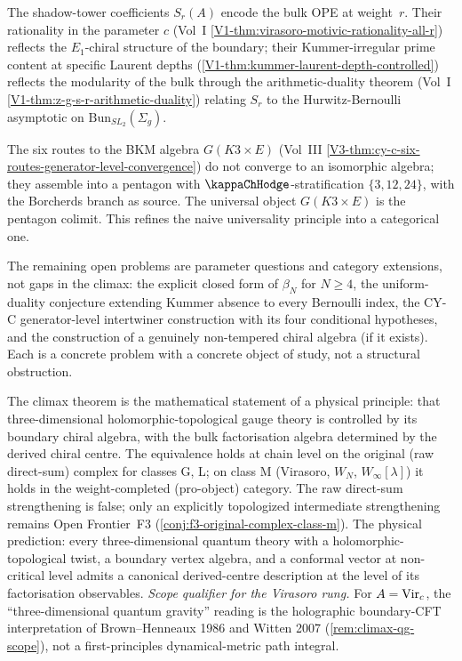 The shadow-tower coefficients $S_{r}(A)$ encode the bulk OPE at
weight~$r$. Their rationality in the parameter $c$ (Vol~I
\cref{V1-thm:virasoro-motivic-rationality-all-r}) reflects the
$E_{1}$-chiral structure of the boundary; their Kummer-irregular
prime content at specific Laurent depths
(\cref{V1-thm:kummer-laurent-depth-controlled}) reflects the
modularity of the bulk through the arithmetic-duality theorem
(Vol~I \cref{V1-thm:z-g-s-r-arithmetic-duality}) relating $S_{r}$ to
the Hurwitz-Bernoulli asymptotic on $\mathrm{Bun}_{SL_{2}}(\Sigma_{g})$.

The six routes to the BKM algebra $G(K3 \times E)$
(Vol~III \cref{V3-thm:cy-c-six-routes-generator-level-convergence})
do not converge to an isomorphic algebra; they assemble into a
pentagon with $\kappaChHodge$-stratification
$\{3, 12, 24\}$, with the Borcherds branch as source. The
universal object $G(K3 \times E)$ is the pentagon colimit. This
refines the naive universality principle into a categorical
one.

\begin{remark}
The remaining open problems are parameter
questions and category extensions, not gaps in the climax: the
explicit closed form of $\beta_{N}$ for $N \ge 4$, the
uniform-duality conjecture extending Kummer absence to every
Bernoulli index, the CY-C generator-level intertwiner
construction with its four conditional hypotheses, and the
construction of a genuinely non-tempered chiral algebra (if it
exists). Each is a concrete problem with a concrete object of
study, not a structural obstruction.
\end{remark}

\begin{remark}
The climax theorem is the mathematical statement of a physical
principle: that three-dimensional holomorphic-topological gauge
theory is controlled by its boundary chiral algebra, with the
bulk factorisation algebra determined by the derived chiral
centre. The equivalence holds at chain level on the original
(raw direct-sum) complex for classes G, L; on class M (Virasoro,
$W_{N}$, $W_{\infty}[\lambda]$) it holds in the weight-completed
(pro-object) category. The raw direct-sum strengthening is false;
only an explicitly topologized intermediate strengthening remains
Open Frontier~F3 (\cref{conj:f3-original-complex-class-m}). The
physical prediction: every three-dimensional quantum theory with
a holomorphic-topological twist, a boundary vertex algebra, and
a conformal vector at non-critical level admits a canonical
derived-centre description at the level of its factorisation
observables. \emph{Scope qualifier for the Virasoro rung.} For
$A = \mathrm{Vir}_{c}$, the ``three-dimensional quantum gravity''
reading is the holographic boundary-CFT interpretation of
Brown--Henneaux 1986 and Witten 2007 (\cref{rem:climax-qg-scope}),
not a first-principles dynamical-metric path integral.
\end{remark}

